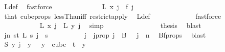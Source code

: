 \begin{isabellebody}
\ L{\isacharunderscore}{\kern0pt}def\ \isamarkupfalse%
\ fastforce\isanewline
\ \ \ \ \ \ \ \ \isamarkupfalse%
\ \isamarkupfalse%
\ {\isacharasterisk}{\kern0pt}\ \isamarkupfalse%
\ {\isachardoublequoteopen}L\ x\ j\ {\isacharequal}{\kern0pt}\ f\ j{\isachardoublequoteclose}\ \isamarkupfalse%
\ that{\isacharparenleft}{\kern0pt}{}{\isacharparenright}{\kern0pt}\ cube{\isacharunderscore}{\kern0pt}props{\isacharparenleft}{\kern0pt}{}{\isacharcomma}{\kern0pt}{}{\isacharparenright}{\kern0pt}\ lessThan{\isacharunderscore}{\kern0pt}iff\ restrict{\isacharunderscore}{\kern0pt}apply\ \isamarkupfalse%
\ L{\isacharunderscore}{\kern0pt}def\ \isanewline
\ \ \ \ \ \ \ \ \ \ \isamarkupfalse%
\ fastforce\isanewline
\ \ \ \ \ \ \ \ \isamarkupfalse%
\ \isamarkupfalse%
\ {\isachardoublequoteopen}L\ x\ j\ {\isacharequal}{\kern0pt}\ L\ y\ j{\isachardoublequoteclose}\ \isamarkupfalse%
\ simp\isanewline
\ \ \ \ \ \ \isamarkupfalse%
\isanewline
\ \ \ \ \ \ \isamarkupfalse%
\ \isamarkupfalse%
\ {\isacharquery}{\kern0pt}thesis\ \isamarkupfalse%
\ blast\isanewline
\ \ \ \ \isamarkupfalse%
\isanewline
\ \ \isamarkupfalse%
\isanewline
\ \ \isamarkupfalse%
\ \isamarkupfalse%
\ {\isachardoublequoteopen}{\isacharparenleft}{\kern0pt}{\isasymexists}j{\isacharless}{\kern0pt}n{\isachardot}{\kern0pt}\ {\isasymforall}s{\isacharless}{\kern0pt}t{\isachardot}{\kern0pt}\ {\isacharparenleft}{\kern0pt}L\ s\ j\ {\isacharequal}{\kern0pt}\ s{\isacharparenright}{\kern0pt}{\isacharparenright}{\kern0pt}{\isachardoublequoteclose}\isanewline
\ \ \isamarkupfalse%
\ {\isacharminus}{\kern0pt}\isanewline
\ \ \ \ \isamarkupfalse%
\ j\ \ j{\isacharunderscore}{\kern0pt}prop{\isacharcolon}{\kern0pt}\ {\isachardoublequoteopen}j\ {\isasymin}\ B\ {}\ {\isasymand}\ j\ {\isacharless}{\kern0pt}\ n{\isachardoublequoteclose}\ \isamarkupfalse%
\ Bf{\isacharunderscore}{\kern0pt}props\ \isamarkupfalse%
\ blast\isanewline
\ \ \ \ \isamarkupfalse%
\ \isamarkupfalse%
\ {\isachardoublequoteopen}{\isacharparenleft}{\kern0pt}S\ y{\isacharparenright}{\kern0pt}\ j\ {\isacharequal}{\kern0pt}\ y\ {}{\isachardoublequoteclose}\ \ {\isachardoublequoteopen}y\ {\isasymin}\ cube\ {}\ t{\isachardoublequoteclose}\ \ y\ \isamarkupfalse%

\end{isabellebody}
